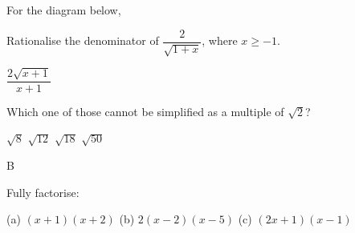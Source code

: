\documentclass{source/quiz}
\begin{document}
\begin{questions}
\question For the diagram below, \droptotalpoints


\question[2] Rationalise the denominator of $\dfrac{2}{\sqrt{1+x}}$, where $x \ge -1$. \droppoints
\begin{answer}
$\dfrac{2 \sqrt{x+1}}{x+1}$
\end{answer}
\vspace{1cm}

\question Which one of those cannot be simplified as a multiple of $\sqrt{2}$?
\begin{choices}
    \choice $\sqrt{8}$
    \choice $\sqrt{12}$
    \choice $\sqrt{18}$
    \choice $\sqrt{50}$
\end{choices}
\begin{answer}
B
\end{answer}
\vspace{1cm}

\question Fully factorise: \droptotalpoints
{}
\begin{answer}
(a) $(x+1)(x+2)$
(b) $2(x-2)(x-5)$
(c) $(2x+1)(x-1)$
\end{answer}

\end{questions}
\end{document}
